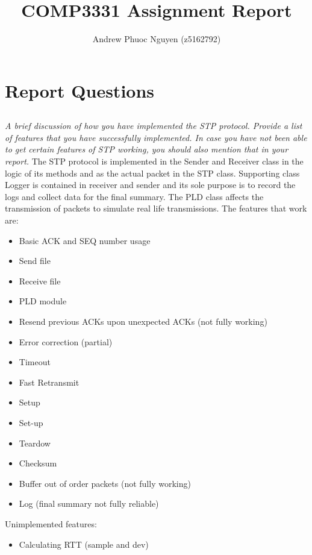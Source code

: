 \documentclass[12pt]{article}
\begin{document}
\author{Andrew Phuoc Nguyen (z5162792)}
\title{COMP3331 Assignment Report}
\maketitle
\section{Report Questions}
\subsection{}
\textit{A brief discussion of how you have implemented the STP protocol. Provide a list of features that you 
have successfully implemented. In case you have not been able to get certain features of STP working, 
you should also mention that in your report. }
\newline 
\newline The STP protocol is implemented in the Sender and Receiver class in the logic of its methods and as the actual packet in the STP class. Supporting class Logger is contained in receiver and sender and its sole purpose is to record the logs and collect data for the final summary. The PLD class affects the transmission of packets to simulate real life transmissions. 
\newline The features that work are:
\begin{itemize}
    \item Basic ACK and SEQ number usage
    \item Send file
    \item Receive file
    \item PLD module
    \item Resend previous ACKs upon unexpected ACKs (not fully working)
    \item Error correction (partial)
    \item Timeout
    \item Fast Retransmit
    \item Setup
    \item Set-up
    \item Teardow
    \item Checksum
    \item Buffer out of order packets (not fully working)
    \item Log (final summary not fully reliable)
\end{itemize}  
Unimplemented features:
\begin{itemize}
    \item Calculating RTT (sample and dev)
\end{itemize}  
\end{document}
